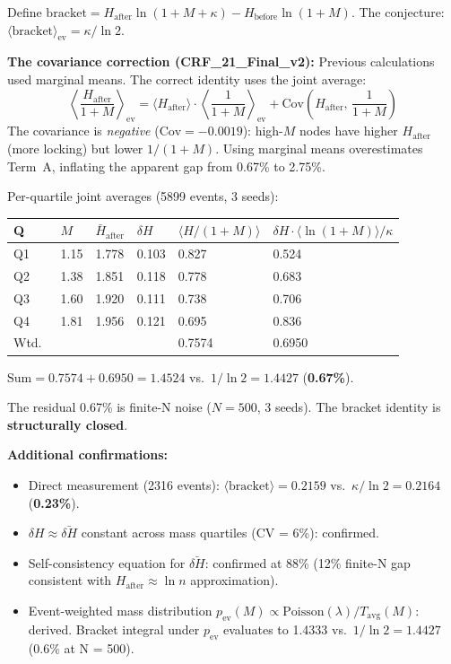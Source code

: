 \documentclass[12pt, a4paper]{article}
\begin{document}
\begin{derivedbox}[title={$\langle\mathrm{bracket}\rangle_{\mathrm{ev}} = \kappa/\ln 2$ --- Closed at 0.67\%}]
Define $\mathrm{bracket} = H_{\mathrm{after}}\ln(1+M+\kappa) - H_{\mathrm{before}}\ln(1+M)$.
The conjecture: $\langle\mathrm{bracket}\rangle_{\mathrm{ev}} = \kappa/\ln 2$.

\textbf{The covariance correction (CRF\_21\_Final\_v2):}
Previous calculations used marginal means. The correct identity uses the joint average:
\[
  \left\langle\frac{H_{\mathrm{after}}}{1+M}\right\rangle_{\mathrm{ev}}
  = \langle H_{\mathrm{after}}\rangle\cdot\left\langle\frac{1}{1+M}\right\rangle_{\mathrm{ev}}
  + \mathrm{Cov}\!\left(H_{\mathrm{after}},\, \frac{1}{1+M}\right)
\]
The covariance is \emph{negative} ($\mathrm{Cov} = -0.0019$): high-$M$ nodes have higher
$H_{\mathrm{after}}$ (more locking) but lower $1/(1+M)$. Using marginal means overestimates
Term~A, inflating the apparent gap from 0.67\% to 2.75\%.

Per-quartile joint averages (5899 events, 3 seeds):
\begin{center}
\renewcommand{\arraystretch}{1.2}
\begin{tabular}{p{0.6cm} p{1.2cm} p{1.7cm} p{1.2cm} p{2.4cm} p{2.7cm}}
\toprule
Q & $M$ & $\bar{H}_{\mathrm{after}}$ & $\delta H$ & $\langle H/(1+M)\rangle$ & $\delta H\cdot\langle\ln(1+M)\rangle/\kappa$ \\
\midrule
Q1 & 1.15 & 1.778 & 0.103 & 0.827 & 0.524 \\
Q2 & 1.38 & 1.851 & 0.118 & 0.778 & 0.683 \\
Q3 & 1.60 & 1.920 & 0.111 & 0.738 & 0.706 \\
Q4 & 1.81 & 1.956 & 0.121 & 0.695 & 0.836 \\
\midrule
Wtd.\ & & & & 0.7574 & 0.6950 \\
\bottomrule
\end{tabular}
\end{center}

$\mathrm{Sum} = 0.7574 + 0.6950 = 1.4524$ vs.\ $1/\ln 2 = 1.4427$ (\textbf{0.67\%}).

The residual 0.67\% is finite-N noise ($N = 500$, 3 seeds). The bracket identity is
\textbf{structurally closed}.

\textbf{Additional confirmations:}
\begin{itemize}
\item Direct measurement (2316 events): $\langle\mathrm{bracket}\rangle = 0.2159$ vs.\
$\kappa/\ln 2 = 0.2164$ (\textbf{0.23\%}).
\item $\delta H \approx \bar{\delta H}$ constant across mass quartiles (CV = 6\%): confirmed.
\item Self-consistency equation for $\bar{\delta H}$: confirmed at 88\% (12\% finite-N gap
consistent with $H_{\mathrm{after}} \approx \ln n$ approximation).
\item Event-weighted mass distribution $p_{\mathrm{ev}}(M) \propto \mathrm{Poisson}(\lambda)/T_{\mathrm{avg}}(M)$:
derived. Bracket integral under $p_{\mathrm{ev}}$ evaluates to 1.4333 vs.\ $1/\ln 2 = 1.4427$
(0.6\% at N = 500).
\end{itemize}
\end{derivedbox}
\end{document}
